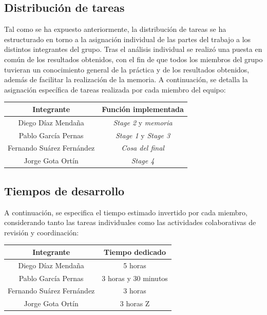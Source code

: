 \documentclass[11pt,a4paper]{article}
\begin{document}
\subsection{Distribución de tareas}
Tal como se ha expuesto anteriormente, la distribución de tareas se ha estructurado en torno a la asignación individual de las partes del trabajo a los distintos integrantes del grupo. Tras el análisis individual se realizó una puesta en común de los resultados obtenidos, con el fin de que todos los miembros del grupo tuvieran un conocimiento general de la práctica y de los resultados obtenidos, además de facilitar la realización de la memoria. A continuación, se detalla la asignación específica de tareas realizada por cada miembro del equipo: \vspace{1ex}
\begin{center}
  \renewcommand{\arraystretch}{1.2}
  \begin{tabular}{|c|c|}
    \hline
    \textbf{Integrante}\cellcolor{azulSuave} & \textbf{Función implementada}\cellcolor{azulSuave} \\
    \hline
    Diego Díaz Mendaña & \textit{Stage 2} y \textit{memoria} \\
    Pablo García Pernas & \textit{Stage 1} y \textit{Stage 3} \\
    Fernando Suárez Fernández & \textit{Cosa del final} \\
    Jorge Gota Ortín & \textit{Stage 4} \\
    \hline
  \end{tabular}
\end{center}
\vspace{3ex}

\subsection{Tiempos de desarrollo}
A continuación, se especifica el tiempo estimado invertido por cada miembro, considerando tanto las tareas individuales como las actividades colaborativas de revisión y coordinación: \vspace{2ex}
\begin{center}
  \renewcommand{\arraystretch}{1.2}
  \begin{tabular}{|c|c|}
    \hline
    \textbf{Integrante}\cellcolor{azulSuave} & \textbf{Tiempo dedicado}\cellcolor{azulSuave} \\
    \hline
    Diego Díaz Mendaña & 5 horas \\
    Pablo García Pernas & 3 horas y 30 minutos \\
    Fernando Suárez Fernández & 3 horas \\
    Jorge Gota Ortín & 3 horas Z\\
    \hline
  \end{tabular}
\end{center}
\end{document}
